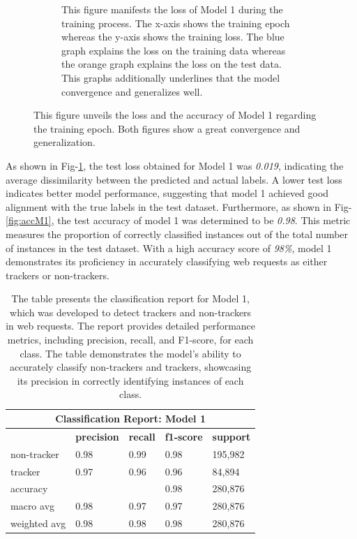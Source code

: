 \begin{figure}[ht!]
\begin{subfigure}[b]{.47\textwidth}
      \caption{This figure manifests the loss of Model 1 during the training process. The x-axis shows the training epoch whereas the y-axis shows
      the training loss. The blue graph explains the loss on the training data whereas the orange graph explains the loss on the test data. 
      This graphs additionally underlines that the model convergence and generalizes well.
    }
      \label{fig:lossM1}
  \end{subfigure}
  \label{}
  \caption{This figure unveils the loss and the accuracy of Model 1 regarding the training epoch. Both figures show a great convergence and generalization.}
\end{figure}
As shown in Fig-\ref{fig:lossM1}, the test loss obtained for Model 1 was \emph{0.019}, indicating the average dissimilarity between the 
predicted and actual labels. A lower test loss indicates better model performance, suggesting that model 1 achieved good alignment
with the true labels in the test dataset. Furthermore, as shown in Fig-\ref{fig:accM1}, the test accuracy of model 1 was determined
to be \emph{0.98}. This metric measures the proportion of correctly classified instances out of the total number of instances in
the test dataset. With a high accuracy score of \emph{98\%}, model 1 demonstrates its proficiency in accurately classifying web
requests as either trackers or non-trackers.

\begin{table}[ht!]
  \begin{center}
    \begin{tabular}[c]{|l|l|l|l|l|}
      \hline
      \multicolumn{5}{|c|}{\textbf{Classification Report: Model 1}} \\
      \hline
      \textbf{} & \textbf{precision} & \textbf{recall} & \textbf{f1-score} & \textbf{support} \\
      \hline
      non-tracker & 0.98 & 0.99 & 0.98 & 195,982 \\
      \hline
      tracker & 0.97 & 0.96 & 0.96 & 84,894 \\
      \hline
      accuracy & & & 0.98 & 280,876 \\
      \hline
      macro avg & 0.98 & 0.97 & 0.97 & 280,876 \\
      \hline
      weighted avg & 0.98 & 0.98 & 0.98 & 280,876 \\
      
      \hline
    \end{tabular}
  \end{center}
  \caption{The table presents the classification report for Model 1, which was developed to detect trackers and non-trackers
  in web requests. The report provides detailed performance metrics, including precision, recall, and F1-score, for each class.
The table demonstrates the model's ability to accurately classify non-trackers and trackers, showcasing
its precision in correctly identifying instances of each class.}
  \label{tab:m1}
\end{table}

